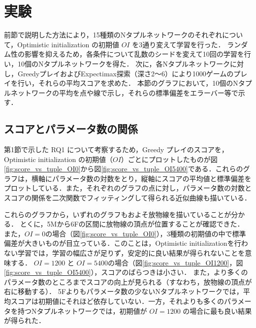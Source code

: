 \section{実験}

前節で説明した方法により，15種類のNタプルネットワークのそれぞれについて，Optimistic initialization の初期値 $\mathit{OI}$ を3通り変えて学習を行った．
ランダム性の影響を抑えるため，各条件について乱数のシードを変えて10回の学習を行い，10個のNタプルネットワークを得た．
次に，各Nタプルネットワークに対し，GreedyプレイおよびExpectimax探索（深さ2〜6）により1000ゲームのプレイを行い，それらの平均スコアを求めた．
本節のグラフにおいて，10個のNタプルネットワークの平均を点や線で示し，それらの標準偏差をエラーバー等で示す．





\subsection{スコアとパラメータ数の関係}
第1節で示した RQ1 について考察するため，Greedy プレイのスコアを，Optimistic initialization の初期値（$\mathit{OI}$）ごとにプロットしたものが図\ref{fig:score_vs_tuple_OI0}から図\ref{fig:score_vs_tuple_OI5400}である．これらのグラフは，横軸にパラメータ数の対数をとり，縦軸にスコアの平均値と標準偏差をプロットしている．また，それぞれのグラフの点に対し，パラメータ数の対数とスコアの関係を二次関数でフィッティングして得られる近似曲線も描いている．

これらのグラフから，いずれのグラフもおよそ放物線を描いていることが分かる．
とくに，\textsf{5M}から\textsf{6F}の区間に放物線の頂点が位置することが確認できた．
また，$\mathit{OI}=0$の場合（図\ref{fig:score_vs_tuple_OI0}），3種類の初期値の中で標準偏差が大きいものが目立っている．このことは，Optimistic initializationを行わない学習では，学習の幅広さが足りず，安定的に良い結果が得られないことを意味する．
$\mathit{OI}=1200$ と $\mathit{OI}=5400$の場合（図\ref{fig:score_vs_tuple_OI1200}，図\ref{fig:score_vs_tuple_OI5400}），スコアのばらつきは小さい．
また，より多くのパラメータ数のところまでスコアの向上が見られる（すなわち，放物線の頂点が右に移動する）．
\textsf{5F}よりもパラメータ数の少ないNタプルネットワークでは，平均スコアは初期値にそれほど依存していない．一方，それよりも多くのパラメータを持つNタプルネットワークでは，初期値が $\mathit{OI}=1200$ の場合に最も良い結果が得られた．


